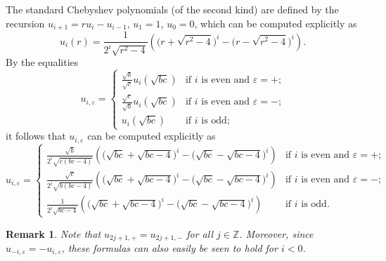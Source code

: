 \documentclass{amsart}
\newtheorem{remark}[theorem]{Remark}
\numberwithin{theorem}{section}
\newcommand{\ZZ}{\mathbb{Z}}
\begin{document}
  The standard Chebyshev polynomials (of the second kind) are defined by the recursion $u_{i+1}=ru_i-u_{i-1}$, $u_1=1$, $u_0=0$, which can be computed explicitly as
  \[u_i(r)=\frac{1}{2^i\sqrt{r^2-4}}\left(\big(r+\sqrt{r^2-4}\big)^i-\big(r-\sqrt{r^2-4}\big)^i\right).\]
  By the equalities 
  \[u_{i,\varepsilon}=\begin{cases} \frac{\sqrt{b}}{\sqrt{c}}u_i(\sqrt{bc}) & \text{if $i$ is even and $\varepsilon=+$;}\\ \frac{\sqrt{c}}{\sqrt{b}}u_i(\sqrt{bc}) & \text{if $i$ is even and $\varepsilon=-$;}\\ u_i(\sqrt{bc}) & \text{if $i$ is odd;} \end{cases}\]
  it follows that $u_{i,\varepsilon}$ can be computed explicitly as
  \[u_{i,\varepsilon}=\begin{cases} \frac{\sqrt{b}}{2^i\sqrt{c(bc-4)}}\left(\big(\sqrt{bc}+\sqrt{bc-4}\big)^i-\big(\sqrt{bc}-\sqrt{bc-4}\big)^i\right) & \text{if $i$ is even and $\varepsilon=+$;}\\ \frac{\sqrt{c}}{2^i\sqrt{b(bc-4)}}\left(\big(\sqrt{bc}+\sqrt{bc-4}\big)^i-\big(\sqrt{bc}-\sqrt{bc-4}\big)^i\right) & \text{if $i$ is even and $\varepsilon=-$;}\\ \frac{1}{2^i\sqrt{bc-4}}\left(\big(\sqrt{bc}+\sqrt{bc-4}\big)^i-\big(\sqrt{bc}-\sqrt{bc-4}\big)^i\right) & \text{if $i$ is odd.} \end{cases}\]
  \begin{remark}
    Note that $u_{2j+1,+}=u_{2j+1,-}$ for all $j\in\ZZ$.
    Moreover, since $u_{-i,\varepsilon}=-u_{i,\varepsilon}$, these formulas can also easily be seen to hold for $i<0$.
  \end{remark}
\end{document}
